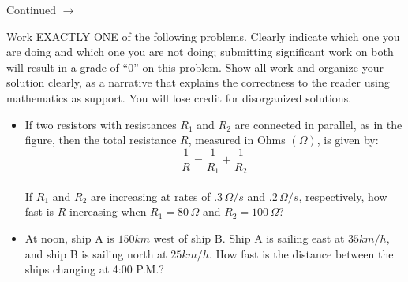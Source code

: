 \documentclass[addpoints]{exam}
\def\pageturn{\vfill
\begin{flushright}
	\begin{small}
		Continued $\rightarrow$
	\end{small}
\end{flushright}
\newpage}
\begin{document}
\begin{questions}
	
\pageturn

\question[20] Work EXACTLY ONE of the following problems. Clearly indicate which one you are doing and which one you are not doing; submitting significant work on both will result in a grade of ``0'' on this problem. Show all work and organize your solution clearly, as a narrative that explains the correctness to the reader using mathematics as support. You will lose credit for disorganized solutions. 
	\begin{itemize}
		\item If two resistors with resistances \(R_1\) and \(R_2\) are connected in parallel, as in the figure, then the total resistance \(R\), measured in Ohms \((\Omega)\), is given by:
		\[\displaystyle\frac{1}{R} =\frac{1}{R_1}+\frac{1}{R_2}\] \leavevmode\\\relax 
		If \(R_1\) and \(R_2\) are increasing at rates of \(.3\,\Omega/s\) and \(.2\, \Omega/s\), respectively, how fast is \(R\) increasing when \(R_1=80\,\Omega\) and \(R_2=100\,\Omega\)?
		\item At noon, ship A is \(150 km\) west of ship B. Ship A is sailing east at \(35 km/h\), and ship B is sailing north at \(25 km/h\). How fast is the distance between the ships changing at 4:00 P.M.?
	\end{itemize}
	

\end{questions}
\end{document}
